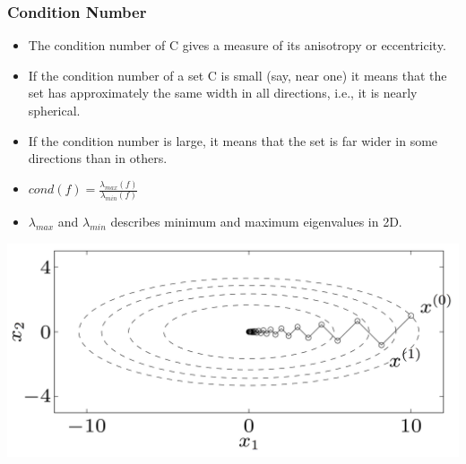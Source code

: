 \begin{frame}

\end{frame}


\begin{frame}
\frametitle{Condition Number}
\begin{itemize}
\item The condition number of C gives a measure of its anisotropy or
  eccentricity.
\item If the condition number of a set C is small (say, near one) it
  means that the set has approximately the same width in all
  directions, i.e., it is nearly spherical.
\item If the condition number is large, it means that the set is far
  wider in some directions than in others.
\item $cond(f) = \frac{\lambda_{max}(f)}{\lambda_{min}(f)}$
\item $\lambda_{max}$ and $\lambda_{min}$ describes minimum and maximum eigenvalues in 2D.
\end{itemize}

\includegraphics[scale=0.08, right]{pics/example.png}
\end{frame}

